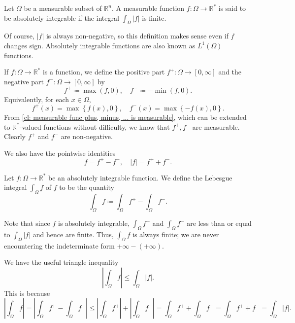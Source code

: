\begin{definition}
    Let \(\Omega\) be a measurable subset of \(\mathbb{R} ^n\). A measurable function \(f: \Omega \to \mathbb{R} ^*\) is said to be absolutely integrable if the integral \(\int _\Omega \vert f \vert \) is finite.
\end{definition}

Of course, \(\vert f \vert \) is always non-negative, so this definition makes sense even if \(f\) changes sign. Absolutely integrable functions are also known as \(L^1(\Omega)\) functions. 

If \(f: \Omega \to \mathbb{R} ^*\) is a function, we define the positive part \(f^+: \Omega \to [0, \infty]\) and the negative part \(f^-: \Omega \to [0, \infty]\) by 
\[
    f^+ \coloneqq \max (f, 0), \quad f^- \coloneqq - \min (f, 0).
\]   
Equivalently, for each \(x \in \Omega\), 
\[
    f^+(x) = \max \left\{ f(x), 0 \right\}, \quad f^-(x) = \max \left\{ -f(x), 0 \right\}.  
\] 
From \autoref{cl: measurable func plus, minus, ... is measurable}, which can be extended to \(\mathbb{R} ^*\)-valued functions without difficulty, we know that \(f^+, f^-\) are measurable. Clearly \(f^+\) and \(f^-\) are non-negative.

We also have the pointwise identities
\[
    f = f^+ - f^-, \quad \vert f \vert = f^+ + f^-. 
\]

\begin{definition}
    Let \(f: \Omega \to \mathbb{R} ^*\) be an absolutely integrable function. We define the Lebesgue integral \(\int _\Omega f\) of \(f\) to be the quantity
    \[
        \int _\Omega f \coloneqq \int _\Omega f^+ - \int _\Omega f^-.
    \]   
\end{definition}

\begin{remark}
    Note that since \(f\) is absolutely integrable, \(\int _\Omega f^+\) and \(\int _\Omega f^-\) are less than or equal to \(\int _\Omega \vert f \vert \) and hence are finite. Thus, \(\int _\Omega f\) is always finite; we are never encountering the indeterminate form \(+ \infty - (+ \infty)\).      
\end{remark}

\begin{remark}
    We have the useful triangle inequality
    \[
        \left\vert \int _\Omega f \right\vert \le \int _\Omega \vert f \vert.
    \]
    This is because
    \[
        \left\vert \int _\Omega f \right\vert = \left\vert \int _\Omega f^+ - \int _\Omega f^- \right\vert \le \left\vert \int _\Omega f^+ \right\vert + \left\vert \int _\Omega f^- \right\vert = \int _\Omega f^+ + \int _\Omega f^- = \int _\Omega f^+ + f^- = \int _\Omega \vert f \vert.     
    \]
\end{remark}

